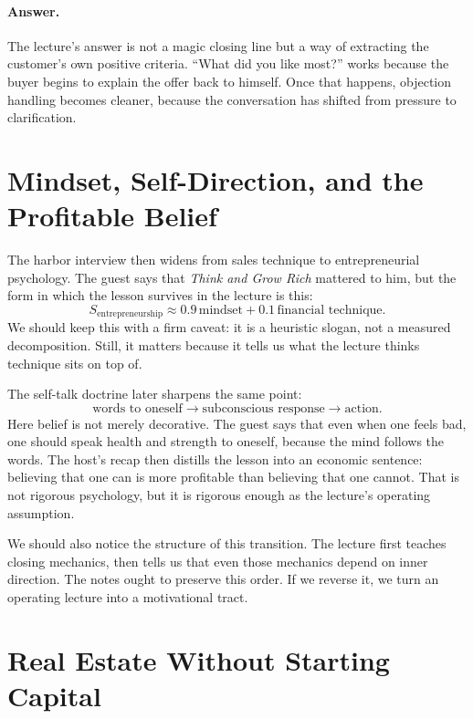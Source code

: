 \paragraph{Answer.} The lecture's answer is not a magic closing line but a way of extracting the customer's own positive criteria. ``What did you like most?'' works because the buyer begins to explain the offer back to himself. Once that happens, objection handling becomes cleaner, because the conversation has shifted from pressure to clarification.

\section{Mindset, Self-Direction, and the Profitable Belief}

The harbor interview then widens from sales technique to entrepreneurial psychology. The guest says that \emph{Think and Grow Rich} mattered to him, but the form in which the lesson survives in the lecture is this:
\begin{equation}
S_{\text{entrepreneurship}} \approx 0.9\,\text{mindset}+0.1\,\text{financial technique}.
\end{equation}
We should keep this with a firm caveat: it is a heuristic slogan, not a measured decomposition. Still, it matters because it tells us what the lecture thinks technique sits on top of.

The self-talk doctrine later sharpens the same point:
\begin{equation}
\text{words to oneself} \to \text{subconscious response} \to \text{action}.
\end{equation}
Here belief is not merely decorative. The guest says that even when one feels bad, one should speak health and strength to oneself, because the mind follows the words. The host's recap then distills the lesson into an economic sentence: believing that one can is more profitable than believing that one cannot. That is not rigorous psychology, but it is rigorous enough as the lecture's operating assumption.

We should also notice the structure of this transition. The lecture first teaches closing mechanics, then tells us that even those mechanics depend on inner direction. The notes ought to preserve this order. If we reverse it, we turn an operating lecture into a motivational tract.

\section{Real Estate Without Starting Capital}


